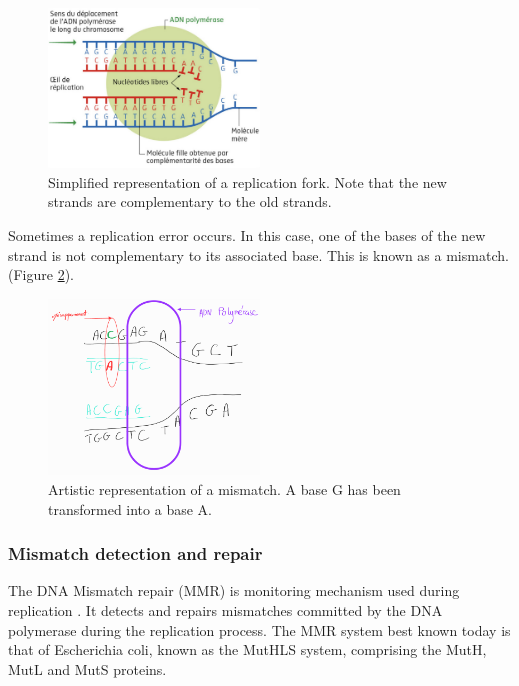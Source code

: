 \begin{figure}
    \centering
    \includegraphics[width=0.5\textwidth]{pictures/replication_ADN.png}
    \caption{Simplified representation of a replication fork. Note that the new strands are complementary to the old strands. \\
     }
    \label{fig:replication_adn}
\end{figure}

Sometimes a replication error occurs. In this case, one of the bases of the new strand is not complementary to its associated base. This is known as a mismatch. (Figure \ref{fig:mesappariement}).

\begin{figure}
    \centering
    \includegraphics[width=0.5\textwidth]{pictures/mesappariement_adn.png}
    \caption{Artistic representation of a mismatch. A base G has been transformed into a base A.}
    \label{fig:mesappariement}
\end{figure}

\subsubsection{Mismatch detection and repair} 
The DNA Mismatch repair (MMR) is monitoring mechanism used during replication \cite{iyer2006dna}. It detects and repairs mismatches committed by the DNA polymerase during the replication process. The MMR system best known today is that of Escherichia coli, known as the MutHLS system, comprising the MutH, MutL and MutS proteins. \\

